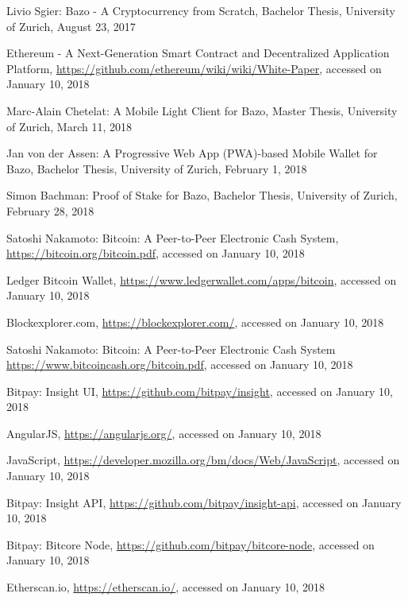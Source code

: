 \begin{thebibliography}{99}

 Livio Sgier: Bazo - A Cryptocurrency from Scratch, Bachelor Thesis, University of Zurich, August 23, 2017

 Ethereum - A Next-Generation Smart Contract and Decentralized Application Platform, \url{https://github.com/ethereum/wiki/wiki/White-Paper}, accessed on January 10, 2018

 Marc-Alain Chetelat: A Mobile Light Client for Bazo, Master Thesis, University of Zurich, March 11, 2018

 Jan von der Assen: A Progressive Web App (PWA)-based Mobile Wallet for Bazo, Bachelor Thesis, University of Zurich, February 1, 2018

 Simon Bachman: Proof of Stake for Bazo, Bachelor Thesis, University of Zurich, February 28, 2018

 Satoshi Nakamoto: Bitcoin: A Peer-to-Peer Electronic Cash System, \url{https://bitcoin.org/bitcoin.pdf}, accessed on January 10, 2018

 Ledger Bitcoin Wallet, \url{https://www.ledgerwallet.com/apps/bitcoin}, accessed on January 10, 2018

 Blockexplorer.com, \url{https://blockexplorer.com/}, accessed on January 10, 2018

 Satoshi Nakamoto: Bitcoin: A Peer-to-Peer Electronic Cash System \url{https://www.bitcoincash.org/bitcoin.pdf}, accessed on January 10, 2018

 Bitpay: Insight UI, \url{https://github.com/bitpay/insight}, accessed on January 10, 2018

 AngularJS, \url{https://angularjs.org/}, accessed on January 10, 2018

 JavaScript, \url{https://developer.mozilla.org/bm/docs/Web/JavaScript}, accessed on January 10, 2018

 Bitpay: Insight API, \url{https://github.com/bitpay/insight-api}, accessed on January 10, 2018

 Bitpay: Bitcore Node, \url{https://github.com/bitpay/bitcore-node}, accessed on January 10, 2018

 Etherscan.io, \url{https://etherscan.io/}, accessed on January 10, 2018


\end{thebibliography}
